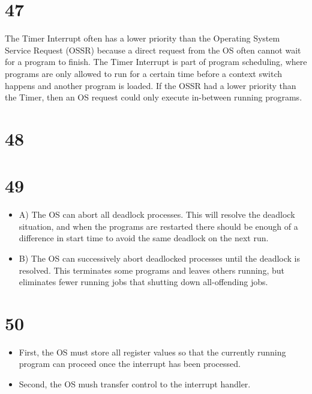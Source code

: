 \documentclass[a4paper,11pt]{article}
\begin{document}

\section*{47}
The Timer Interrupt often has a lower priority than the Operating System Service Request (OSSR) because a direct request from the OS often cannot wait for a program to finish.  The Timer Interrupt is part of program scheduling, where programs are only allowed to run for a certain time before a context switch happens and another program is loaded.  If the OSSR had a lower priority than the Timer, then an OS request could only execute in-between running programs.  



\section*{48}


\section*{49}
\begin{itemize}
  \item A) The OS can abort all deadlock processes.  This will resolve the deadlock situation, and when the programs are restarted there should be enough of a difference in start time to avoid the same deadlock on the next run.  
  \item B) The OS can successively abort deadlocked processes until the deadlock is resolved.  This terminates some programs and leaves others running, but eliminates fewer running jobs that shutting down all-offending jobs.  
\end{itemize}


\section*{50}
\begin{itemize}
  \item First, the OS must store all register values so that the currently running program can proceed once the interrupt has been processed.
  \item Second, the OS mush transfer control to the interrupt handler.
\end{itemize}
\end{document}
